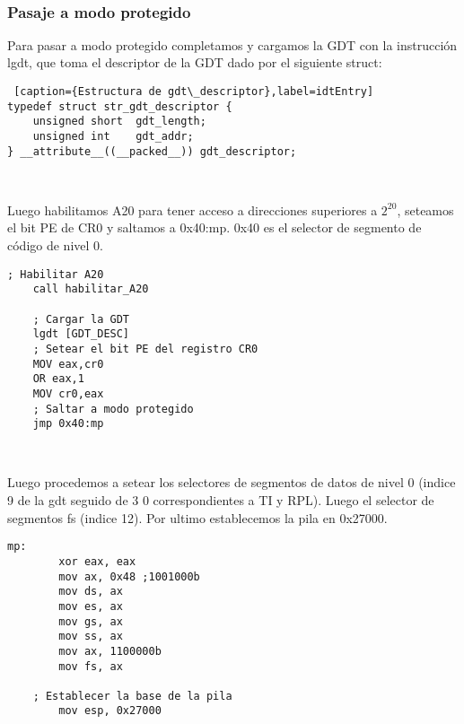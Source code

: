 \\
\subsubsection*{Pasaje a modo protegido}

\par{Para pasar a modo protegido completamos y cargamos la GDT con la instrucci\'on lgdt, que toma el descriptor de la GDT dado por el siguiente struct:}

\begin{lstlisting} [caption={Estructura de gdt\_descriptor},label=idtEntry]
typedef struct str_gdt_descriptor {
    unsigned short  gdt_length;
    unsigned int    gdt_addr;
} __attribute__((__packed__)) gdt_descriptor;

\end{lstlisting}

\\
\par{Luego habilitamos A20 para tener acceso a direcciones superiores a $2^{20}$, seteamos el bit PE de CR0 y saltamos a 0x40:mp. 0x40 es el selector de segmento de c\'odigo de nivel 0.}

\begin{lstlisting}[caption={Bloque para saltar a modo protegido},label=idtEntry]
    ; Habilitar A20
    call habilitar_A20
    
    ; Cargar la GDT
    lgdt [GDT_DESC]
    ; Setear el bit PE del registro CR0
    MOV eax,cr0 
    OR eax,1 
    MOV cr0,eax
    ; Saltar a modo protegido
    jmp 0x40:mp
\end{lstlisting}

\\
\par{Luego procedemos a setear los selectores de segmentos de datos de nivel 0 (indice 9 de la gdt seguido de 3 0 correspondientes a TI y RPL). Luego el selector de segmentos fs (indice 12). Por ultimo establecemos la pila en 0x27000.}
\begin{lstlisting}[caption={Bloque para setear los selectores de segmento},label=idtEntry]
    mp:
        xor eax, eax
        mov ax, 0x48 ;1001000b
        mov ds, ax
        mov es, ax
        mov gs, ax
        mov ss, ax  
        mov ax, 1100000b
        mov fs, ax

    ; Establecer la base de la pila
        mov esp, 0x27000
\end{lstlisting}



